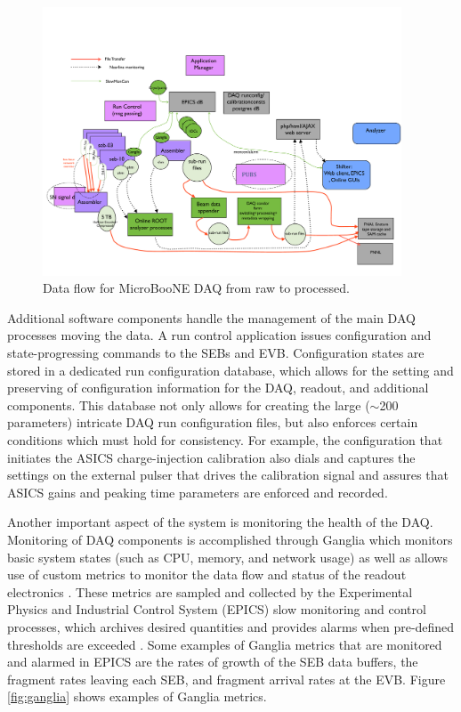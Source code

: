 \begin{figure}
\centering
\includegraphics[width=0.95\textwidth]{./figures/dataFlow.pdf}
\caption{Data flow for MicroBooNE DAQ from raw to processed.}
\label{fig:dataflow}
\end{figure}


Additional software components handle the management of the main DAQ processes moving the data. A run control application issues configuration and state-progressing commands to the SEBs and EVB. Configuration states are stored in a dedicated run configuration database, which allows for the setting and preserving of configuration information for the DAQ, readout, and additional components. This database not only allows for creating the large ($\sim$200 parameters) intricate DAQ run configuration files, but also enforces certain conditions which must hold for consistency. For example, the configuration that initiates the ASICS charge-injection calibration also dials and captures the settings on the external pulser that drives the calibration signal and assures that ASICS gains and peaking time parameters are enforced and recorded. %

Another important aspect of the system is monitoring the health of the DAQ. Monitoring of DAQ components is accomplished through Ganglia which monitors basic system states (such as CPU, memory, and network usage) as well as allows use of custom metrics to monitor the data flow and status of the readout electronics \cite{GangliaBook}. These metrics are sampled and collected by the Experimental Physics and Industrial Control System (EPICS) slow monitoring and control processes, which archives desired quantities and provides alarms when pre-defined thresholds are exceeded \cite{EPICS}. Some examples of Ganglia metrics that are monitored and alarmed in EPICS are the rates of growth of the SEB data buffers, the fragment rates leaving each SEB, and fragment arrival rates at the EVB.  Figure \ref{fig:ganglia} shows examples of Ganglia metrics.  

